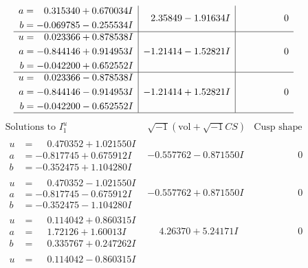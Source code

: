 \documentclass[1p]{elsarticle_modified}
\theoremstyle{definition}
\newcommand{\I}{\sqrt{-1}}
\begin{document}
$$\begin{array}{c|c|c}
\begin{aligned}
a &= \phantom{-}0.315340 + 0.670034 I \\
b &= -0.069785 - 0.255534 I\end{aligned}
 & \phantom{-}2.35849 - 1.91634 I & \phantom{-0.000000 } 0 \\ \hline\begin{aligned}
u &= \phantom{-}0.023366 + 0.878538 I \\
a &= -0.844146 + 0.914953 I \\
b &= -0.042200 + 0.652552 I\end{aligned}
 & -1.21414 - 1.52821 I & \phantom{-0.000000 } 0 \\ \hline\begin{aligned}
u &= \phantom{-}0.023366 - 0.878538 I \\
a &= -0.844146 - 0.914953 I \\
b &= -0.042200 - 0.652552 I\end{aligned}
 & -1.21414 + 1.52821 I & \phantom{-0.000000 } 0\\
 \hline 
 \end{array}$$\newpage$$\begin{array}{c|c|c}  
\text{Solutions to }I^u_{1}& \I (\text{vol} + \sqrt{-1}CS) & \text{Cusp shape}\\
 \hline 
\begin{aligned}
u &= \phantom{-}0.470352 + 1.021550 I \\
a &= -0.817745 + 0.675912 I \\
b &= -0.352475 + 1.104280 I\end{aligned}
 & -0.557762 - 0.871550 I & \phantom{-0.000000 } 0 \\ \hline\begin{aligned}
u &= \phantom{-}0.470352 - 1.021550 I \\
a &= -0.817745 - 0.675912 I \\
b &= -0.352475 - 1.104280 I\end{aligned}
 & -0.557762 + 0.871550 I & \phantom{-0.000000 } 0 \\ \hline\begin{aligned}
u &= \phantom{-}0.114042 + 0.860315 I \\
a &= \phantom{-}1.72126 + 1.60013 I \\
b &= \phantom{-}0.335767 + 0.247262 I\end{aligned}
 & \phantom{-}4.26370 + 5.24171 I & \phantom{-0.000000 } 0 \\ \hline\begin{aligned}
u &= \phantom{-}0.114042 - 0.860315 I \\

\end{aligned}
\end{array}$$
\end{document}

